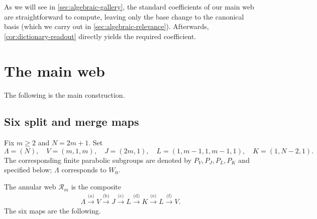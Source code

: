 \documentclass[a4paper,11pt]{amsart}
\numberwithin{equation}{subsection}
\theoremstyle{plain}
\theoremstyle{definition}
\theoremstyle{remark}
\begin{document}
As we will see in \autoref{sec:algebraic-gallery}, the standard coefficients of our main web are straightforward to compute, leaving only the base change to the canonical basis (which we carry out in \autoref{sec:algebraic-relevance}). Afterwards, \autoref{cor:dictionary-readout} directly yields the required coefficient.

\section{The main web}\label{sec:algebraic-gallery}

The following is the main construction.

\subsection{Six split and merge maps}\label{S:MainWeb}

Fix $m\ge2$ and $N=2m+1$. Set
\[
\Lambda=(N),\quad V=(m,1,m),\quad J=(2m,1),\quad
L=(1,m-1,1,m-1,1),\quad K=(1,N-2,1).
\]
The corresponding finite parabolic subgroups are denoted by
$P_V,P_J,P_L,P_K$ and specified below; $\Lambda$ corresponds
to $W_0$.

The annular web $\mathcal R_m$ is the composite
\begin{gather*}
\Lambda\xrightarrow{\text{(a)}}V
\xrightarrow{\text{(b)}}J
\xrightarrow{\text{(c)}}L
\xrightarrow{\text{(d)}}K
\xrightarrow{\text{(e)}}L
\xrightarrow{\text{(f)}}V.
\end{gather*}
The six maps are the following.
\begingroup
\end{document}
